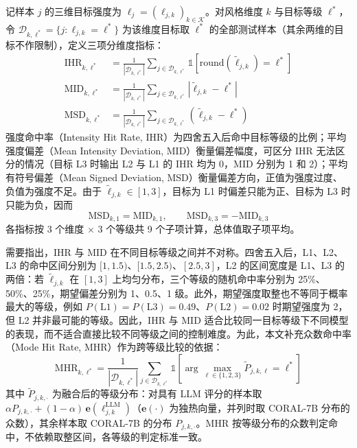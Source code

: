 \documentclass[fontset=fandol,type=master,campus=shenzhen,etitleauto=true]{hithesisbook}
\begin{document}
记样本 $j$ 的三维目标强度为 $\boldsymbol{\ell}_j = (\ell_{j,k})_{k \in \mathcal{K}}$。对风格维度 $k$ 与目标等级 $\ell^*$，令 $\mathcal{D}_{k,\ell^*} = \{ j : \ell_{j,k} = \ell^* \}$ 为该维度目标取 $\ell^*$ 的全部测试样本（其余两维的目标不作限制），定义三项分维度指标：
\begin{equation}
\begin{aligned}
\text{IHR}_{k,\ell^*} &= \frac{1}{|\mathcal{D}_{k,\ell^*}|} \sum_{j \in \mathcal{D}_{k,\ell^*}} \mathbb{1}\!\left[\text{round}(\tilde{\ell}_{j,k}) = \ell^*\right] \\
\text{MID}_{k,\ell^*} &= \frac{1}{|\mathcal{D}_{k,\ell^*}|} \sum_{j \in \mathcal{D}_{k,\ell^*}} \left|\tilde{\ell}_{j,k} - \ell^*\right| \\
\text{MSD}_{k,\ell^*} &= \frac{1}{|\mathcal{D}_{k,\ell^*}|} \sum_{j \in \mathcal{D}_{k,\ell^*}} \left(\tilde{\ell}_{j,k} - \ell^*\right)
\end{aligned}
\end{equation}
强度命中率（Intensity Hit Rate, IHR）为四舍五入后命中目标等级的比例；平均强度偏差（Mean Intensity Deviation, MID）衡量偏差幅度，可区分 IHR 无法区分的情况（目标 L3 时输出 L2 与 L1 的 IHR 均为 0，MID 分别为 1 和 2）；平均有符号偏差（Mean Signed Deviation, MSD）衡量偏差方向，正值为强度过度、负值为强度不足。由于 $\tilde{\ell}_{j,k} \in [1, 3]$，目标为 L1 时偏差只能为正、目标为 L3 时只能为负，因而
\begin{equation}\label{eq:msd-mid}
\text{MSD}_{k,1} = \text{MID}_{k,1}, \qquad \text{MSD}_{k,3} = -\text{MID}_{k,3}
\end{equation}
各指标按 3 个维度 × 3 个等级共 9 个子项计算，总体值取子项平均。

需要指出，IHR 与 MID 在不同目标等级之间并不对称。四舍五入后，L1、L2、L3 的命中区间分别为 $[1, 1.5)$、$[1.5, 2.5)$、$[2.5, 3]$，L2 的区间宽度是 L1、L3 的两倍：若 $\tilde{\ell}_{j,k}$ 在 $[1, 3]$ 上均匀分布，三个等级的随机命中率分别为 25\%、50\%、25\%，期望偏差分别为 1、0.5、1 级。此外，期望强度取整也不等同于概率最大的等级，例如 $P(\text{L1}) = P(\text{L3}) = 0.49$、$P(\text{L2}) = 0.02$ 时期望强度为 2，但 L2 并非最可能的等级。因此，IHR 与 MID 适合比较同一目标等级下不同模型的表现，而不适合直接比较不同等级之间的控制难度。为此，本文补充众数命中率（Mode Hit Rate, MHR）作为跨等级比较的依据：
\begin{equation}\label{eq:mhr}
\text{MHR}_{k,\ell^*} = \frac{1}{|\mathcal{D}_{k,\ell^*}|} \sum_{j \in \mathcal{D}_{k,\ell^*}} \mathbb{1}\!\left[ \arg\max_{\ell \in \{1,2,3\}} \tilde{P}_{j,k,\ell} = \ell^* \right]
\end{equation}
其中 $\tilde{P}_{j,k,\cdot}$ 为融合后的等级分布：对具有 LLM 评分的样本取 $\alpha P_{j,k,\cdot} + (1 - \alpha)\, \mathbf{e}(\ell^{\text{LLM}}_{j,k})$（$\mathbf{e}(\cdot)$ 为独热向量，并列时取 CORAL-7B 分布的众数），其余样本取 CORAL-7B 的分布 $P_{j,k,\cdot}$。MHR 按等级分布的众数判定命中，不依赖取整区间，各等级的判定标准一致。
\end{document}

